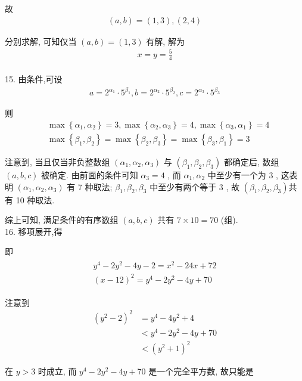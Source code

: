 故
\begin{align*}
	(a, b)=(1,3),(2,4)
\end{align*}

分别求解, 可知仅当 $(a, b)=(1,3)$ 有解, 解为
\begin{align*}
	x=y=\frac{5}{4}
\end{align*}\\
15. 由条件,可设
\begin{align*}
	a=2^{\alpha_{1}} \cdot 5^{\beta_{1}}, b=2^{\alpha_{2}} \cdot 5^{\beta_{2}}, c=2^{\alpha_{3}} \cdot 5^{\beta_{3}}
\end{align*}

则\begin{align}
	 & \max \left\{\alpha_{1}, \alpha_{2}\right\}=3, \max \left\{\alpha_{2}, \alpha_{3}\right\}=4, \max \left\{\alpha_{3}, \alpha_{1}\right\}=4 \\
	 & \max \left\{\beta_{1}, \beta_{2}\right\}=\max \left\{\beta_{2}, \beta_{3}\right\}=\max \left\{\beta_{3}, \beta_{1}\right\}=3
\end{align}

注意到, 当且仅当非负整数组 $\left(\alpha_{1}, \alpha_{2}, \alpha_{3}\right)$ 与 $\left(\beta_{1}, \beta_{2}, \beta_{3}\right)$ 都确定后, 数组 $(a, b, c)$ 被确定. 由前面的条件可知 $\alpha_{3}=4$ , 而 $\alpha_{1} ,  \alpha_{2}$ 中至少有一个为 3 , 这表明 $\left(\alpha_{1}, \alpha_{2}, \alpha_{3}\right)$ 有 7 种取法;  $\beta_{1} ,  \beta_{2} ,  \beta_{3}$ 中至少有两个等于 3 , 故 $\left(\beta_{1}, \beta_{2}, \beta_{3}\right)$共有 10 种取法.

综上可知, 满足条件的有序数组 $(a, b, c)$ 共有 $7 \times 10=70$ (组).\\
16. 移项展开,得

即
\begin{align*}
	\begin{gathered}
		y^{4}-2 y^{2}-4 y-2=x^{2}-24 x+72 \\
		(x-12)^{2}=y^{4}-2 y^{2}-4 y+70
	\end{gathered}
\end{align*}

注意到\begin{align}
	\left(y^{2}-2\right)^{2} & =y^{4}-4 y^{2}+4          \\
	                         & <y^{4}-2 y^{2}-4 y+70     \\
	                         & <\left(y^{2}+1\right)^{2}
\end{align}

在 $y>3$ 时成立, 而 $y^{4}-2 y^{2}-4 y+70$ 是一个完全平方数, 故只能是

